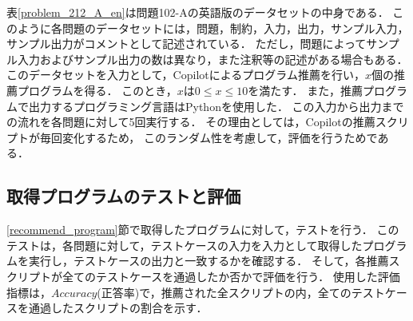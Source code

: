     表\ref{problem_212_A_en}は問題102-Aの英語版のデータセットの中身である．
    このように各問題のデータセットには，問題，制約，入力，出力，サンプル入力，サンプル出力がコメントとして記述されている．
    ただし，問題によってサンプル入力およびサンプル出力の数は異なり，また注釈等の記述がある場合もある．
    このデータセットを入力として，Copilotによるプログラム推薦を行い，$x$個の推薦プログラムを得る．
    このとき，$x$は$0 {\leq} x {\leq} 10$を満たす．
    また，推薦プログラムで出力するプログラミング言語はPythonを使用した．
    この入力から出力までの流れを各問題に対して5回実行する．
    その理由としては，Copilotの推薦スクリプトが毎回変化するため，
    このランダム性を考慮して，評価を行うためである．
    
  \subsection{取得プログラムのテストと評価\label{test_and_evaluation}}
    \ref{recommend_program}節で取得したプログラムに対して，テストを行う．
    このテストは，各問題に対して，テストケースの入力を入力として取得したプログラムを実行し，テストケースの出力と一致するかを確認する．
    そして，各推薦スクリプトが全てのテストケースを通過したか否かで評価を行う．
    使用した評価指標は，$Accuracy$(正答率)で，推薦された全スクリプトの内，全てのテストケースを通過したスクリプトの割合を示す．


